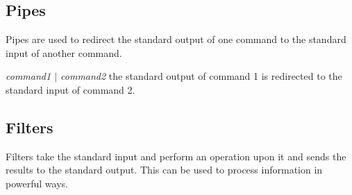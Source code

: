 \documentclass{article}
\begin{document}
\subsection{Pipes}
Pipes are used to redirect the standard output of one command to the standard input of another command.

\hspace{10mm} \textit{command1 $|$ command2} the standard output of command 1 is redirected to the standard input of command 2.

\subsection{Filters}

Filters take the standard input and perform an operation upon it and sends the results to the standard output. This can be used to process information in powerful ways.
\end{document}
